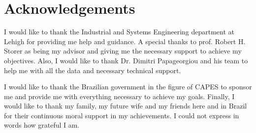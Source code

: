 \chapter*{Acknowledgements}

I would like to thank the Industrial and Systems Engineering department at Lehigh for providing me help and guidance. A special thanks to prof. Robert H. Storer as being my advisor and giving me the necessary support to achieve my objectives. Also, I would like to thank Dr. Dimitri Papageorgiou and his team to help me with all the data and necessary technical support.

I would like to thank the Brazilian government in the figure of CAPES to sponsor me and provide me with everything necessary to achieve my goals. Finally, I would like to thank my family, my future wife and my friends here and in Brazil for their continuous moral support in my achievements. I could not express in words how grateful I am.